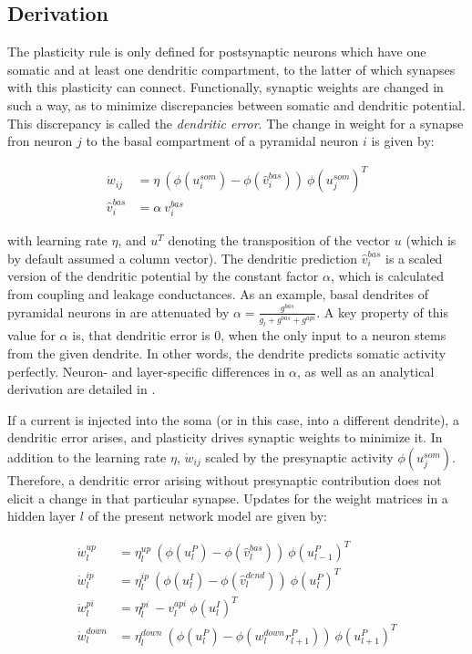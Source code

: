 \subsection{Derivation}

The plasticity rule is only defined for postsynaptic neurons which have one somatic and at least one dendritic
compartment, to the latter of which synapses with this plasticity can connect. Functionally, synaptic weights are
changed in such a way, as to minimize discrepancies between somatic and dendritic potential. This discrepancy is called
the \textit{dendritic error}. The change in weight for a synapse fron neuron $j$ to the basal compartment of a pyramidal
neuron $i$ is given by:

\begin{align}
  \dot{w}_{ij}    & = \eta \ ( \phi(u_i^{som}) - \phi(\hat{v}_i^{bas}) ) \ \phi(u_j^{som})^T \\
  \hat{v}_i^{bas} & = \alpha \  v_i^{bas}
\end{align}

with learning rate $\eta$, and $u^T$ denoting the transposition of the vector $u$ (which is by default assumed a column
vector). The dendritic prediction $\hat{v}_i^{bas}$ is a scaled version of the dendritic potential by the constant
factor $\alpha$, which is calculated from coupling and leakage conductances. As an example, basal dendrites of pyramidal
neurons in \cite{sacramento2018dendritic} are attenuated by $\alpha = \frac{g^{bas}}{g_l + g^{bas} + g^{api}}$. A key
property of this value for $\alpha$ is, that dendritic error is $0$, when the only input to a neuron stems from the
given dendrite. In other words, the dendrite predicts somatic activity perfectly. Neuron- and layer-specific differences
in $\alpha$, as well as an analytical derivation are detailed in \citep{sacramento2018dendritic}.

If a current is injected into the soma (or in this case, into a different dendrite), a dendritic error arises, and
plasticity drives synaptic weights to minimize it. In addition to the learning rate $\eta$, $\dot{w}_{ij}$ scaled by the
presynaptic activity $\phi(u_j^{som})$. Therefore, a dendritic error arising without presynaptic contribution does not
elicit a change in that particular synapse.  
Updates for the weight matrices in a hidden layer $l$ of the present network model are given by:

\begin{align}
  \dot{w}_{l}^{up}   & = \eta_l^{up} \ ( \phi(u_l^{P}) - \phi(\hat{v}_l^{bas}) ) \ \phi(u_{l-1}^{P})^T\label{eq-delta_w_up}         \\
  \dot{w}_{l}^{ip}   & = \eta_l^{ip} \ ( \phi(u_l^{I}) - \phi(\hat{v}_l^{dend}) ) \ \phi(u_{l}^{P})^T\label{eq-delta_w_ip}          \\
  \dot{w}_{l}^{pi}   & = \eta_l^{pi} \ - v_l^{api} \ \phi(u_l^{I})^T\label{eq-delta_w_pi}                                           \\
  \dot{w}_{l}^{down} & = \eta_l^{down} \ ( \phi(u_l^{P}) - \phi(w_l^{down} r_{l+1}^P) )\ \phi(u_{l+1}^{P})^T\label{eq-delta_w_down}
\end{align}

